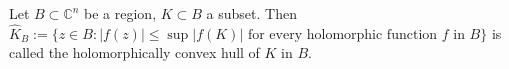 Let $B \subset \mathbb{C}^n$ be a region, $K \subset B$ a subset. Then $\hat{K}_B := \{ z \in B : |f(z)| \leqslant \sup|f(K)| \text{ for every holomorphic function } f \text{ in } B \}$ is called the holomorphically convex hull of $K$ in $B$.
